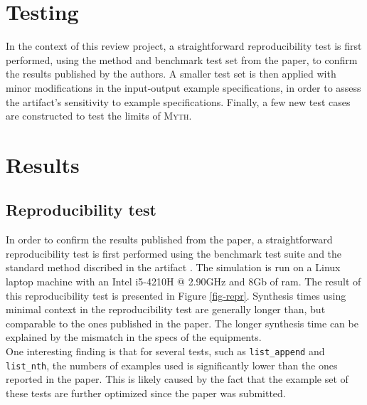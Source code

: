 \documentclass[preprint, 11pt]{sigplanconf}
\begin{document}
\section{Testing}\label{sec-test}

In the context of this review project, a straightforward reproducibility test is first performed, using the method and benchmark test set from the paper, to confirm the results published by the authors. A smaller test set is then applied with minor modifications in the input-output example specifications, in order to assess the artifact's sensitivity to example specifications. Finally, a few new test cases are constructed to test the limits of \textsc{Myth}.\\

\section{Results}\label{sec-resu}

\subsection{Reproducibility test}\label{sec-repr}

In order to confirm the results published from the paper, a straightforward reproducibility test is first performed using the benchmark test suite and the standard method discribed in the artifact \citet{osera2015type}. The simulation is run on a Linux laptop machine with an Intel i5-4210H @ 2.90GHz and 8Gb of ram. The result of this reproducibility test is presented in Figure \ref{fig-repr}. Synthesis times using minimal context in the reproducibility test are generally longer than, but comparable to the ones published in the paper. The longer synthesis time can be explained by the mismatch in the specs of the equipments.\\

One interesting finding is that for several tests, such as \texttt{list\_append} and \texttt{list\_nth}, the numbers of examples used is significantly lower than the ones reported in the paper. This is likely caused by the fact that the example set of these tests are further optimized since the paper was submitted.\\
\end{document}
